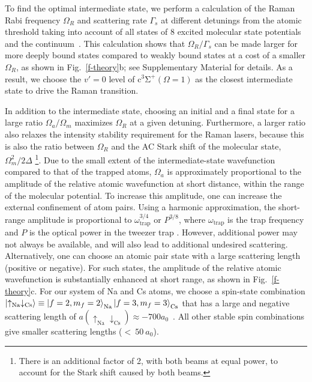 \documentclass[aps,prl,twocolumn,10pt,superscriptaddress]{revtex4-1}
\newcommand{\Na}{\mathrm{Na}}
\newcommand{\Cs}{\mathrm{Cs}}
\begin{document}
To find the optimal intermediate state, we perform a calculation of the Raman Rabi frequency $\Omega_R$
and scattering rate $\Gamma_s$ at different detunings from the atomic threshold
taking into account of all states of
8 excited molecular state potentials~\cite{Korek2007, Grochola2011, Zaharova2009, Grochola2010, Zabawa2012}
and the continuum~\cite{Liu2017}.
This calculation shows that $\Omega_R/\Gamma_s$
can be made larger for more deeply bound states compared to weakly bound states
at a cost of a smaller $\Omega_R$, as shown in Fig.~\ref{f-theory}b;
see Supplementary Material for details.
As a result, we choose the $v'=0$ level of $\mathrm{c^3\Sigma^+}(\Omega = 1)$
as the closest intermediate state to drive the Raman transition.

In addition to the intermediate state,
choosing an initial and a final state for a large ratio $\Omega_a/\Omega_m$
maximizes $\Omega_R$ at a given detuning.
Furthermore, a larger ratio also relaxes the intensity stability requirement for the Raman lasers,
because this is also the ratio between $\Omega_R$
and the AC Stark shift of the molecular state, $\Omega_m^2 / 2\Delta$
\footnote{There is an additional factor of 2, with both beams at equal power,
  to account for the Stark shift caused by both beams.}.
Due to the small extent of the intermediate-state wavefunction
compared to that of the trapped atoms,
$\Omega_a$ is approximately proportional to
the amplitude of the relative atomic wavefunction at short distance,
within the range of the molecular potential.
To increase this amplitude, one can increase the external confinement of atom pairs.
Using a harmonic approximation,
the short-range amplitude is proportional to $ \omega_{\text{trap}}^{3/4} $ or $P^{3/8}$,
where $ \omega_{\text{trap}} $ is the trap frequency and $P$ is the optical power in the tweezer trap \cite{Mies2000}. However, additional power may not always be available, and will also lead to additional undesired scattering.
Alternatively, one can choose an atomic pair state with a large scattering length
(positive or negative).
For such states, the amplitude of the relative atomic wavefunction is substantially enhanced
at short range, as shown in Fig.~\ref{f-theory}c.
For our system of Na and Cs atoms,
we choose a spin-state combination $\ket{\uparrow_{\Na} \downarrow_{\Cs}}\equiv \ket{f=2,m_f=2}_{\Na}\ket{f=3,m_f=3}_{\Cs}$ that has a large and negative scattering length of
$a(\uparrow_{\Na} \downarrow_{\Cs}) \approx -700a_0$~\cite{Hood2019}.
All other stable spin combinations give smaller scattering lengths ($<~50~a_0$).
\end{document}
